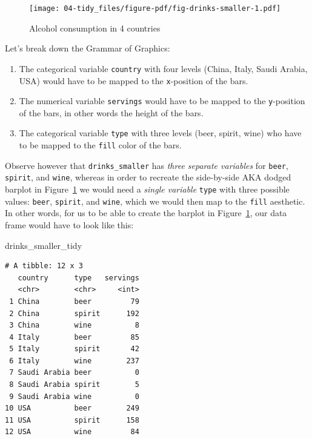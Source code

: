 \documentclass[
  letterpaper,
  DIV=11,
  numbers=noendperiod]{scrreprt}
\newenvironment{Shaded}{\begin{snugshade}}{\end{snugshade}}
\newcommand{\NormalTok}[1]{\textcolor[rgb]{0.00,0.23,0.31}{#1}}
\theoremstyle{definition}
\theoremstyle{remark}
\begin{document}
\begin{figure}

{\centering \texttt{[image: 04-tidy\_files/figure-pdf/fig-drinks-smaller-1.pdf]}

}

\caption{\label{fig-drinks-smaller}Alcohol consumption in 4 countries}

\end{figure}

Let's break down the Grammar of Graphics:

\begin{enumerate}
\def\labelenumi{\arabic{enumi}.}
\item
  The categorical variable \texttt{country} with four levels (China,
  Italy, Saudi Arabia, USA) would have to be mapped to the
  \texttt{x}-position of the bars.
\item
  The numerical variable \texttt{servings} would have to be mapped to
  the \texttt{y}-position of the bars, in other words the height of the
  bars.
\item
  The categorical variable \texttt{type} with three levels (beer,
  spirit, wine) who have to be mapped to the \texttt{fill} color of the
  bars.
\end{enumerate}

Observe however that \texttt{drinks\_smaller} has \emph{three separate
variables} for \texttt{beer}, \texttt{spirit}, and \texttt{wine},
whereas in order to recreate the side-by-side AKA dodged barplot in
Figure~\ref{fig-drinks-smaller} we would need a \emph{single variable}
\texttt{type} with three possible values: \texttt{beer},
\texttt{spirit}, and \texttt{wine}, which we would then map to the
\texttt{fill} aesthetic. In other words, for us to be able to create the
barplot in Figure~\ref{fig-drinks-smaller}, our data frame would have to
look like this:

\begin{Shaded}
\begin{Highlighting}[]
\NormalTok{drinks\_smaller\_tidy}
\end{Highlighting}
\end{Shaded}

\begin{verbatim}
# A tibble: 12 x 3
   country      type   servings
   <chr>        <chr>     <int>
 1 China        beer         79
 2 China        spirit      192
 3 China        wine          8
 4 Italy        beer         85
 5 Italy        spirit       42
 6 Italy        wine        237
 7 Saudi Arabia beer          0
 8 Saudi Arabia spirit        5
 9 Saudi Arabia wine          0
10 USA          beer        249
11 USA          spirit      158
12 USA          wine         84
\end{verbatim}
\end{document}

